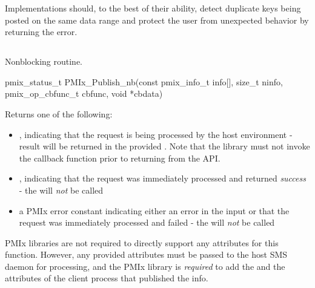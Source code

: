 \adviceimplstart
Implementations should, to the best of their ability, detect duplicate keys being posted on the same data range and protect the
user from unexpected behavior by returning the  error.
\adviceimplend

\subsection{}

\summary

Nonblocking  routine.

\format

\cspecificstart
\begin{codepar}
pmix_status_t
PMIx_Publish_nb(const pmix_info_t info[], size_t ninfo,
                pmix_op_cbfunc_t cbfunc, void *cbdata)
\end{codepar}
\cspecificend

\begin{arglist}
\end{arglist}

Returns one of the following:

\begin{itemize}
    \item {}, indicating that the request is being processed by the host environment - result will be returned in the provided . Note that the library must not invoke the callback function prior to returning from the \ac{API}.
    \item {}, indicating that the request was immediately processed and returned \textit{success} - the  will \textit{not} be called
    \item a PMIx error constant indicating either an error in the input or that the request was immediately processed and failed - the  will \textit{not} be called
\end{itemize}

\reqattrstart
\ac{PMIx} libraries are not required to directly support any attributes for this function. However, any provided attributes must be passed to the host \ac{SMS} daemon for processing, and the \ac{PMIx} library is \textit{required} to add the  and the  attributes of the client process that published the info.

